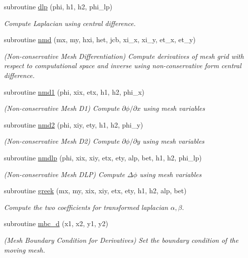 \begin{DoxyCompactItemize}
subroutine \hyperlink{classmirana_a353bce8a93046cd8fd25021634d6503e}{dlp} (phi, h1, h2, phi\-\_\-lp)
\begin{DoxyCompactList}\small\item\em Compute Laplacian using central difference. \end{DoxyCompactList}\item 
subroutine \hyperlink{classmirana_a53c223d4530275ef3fc6a5820f5b0990}{nmd} (mx, my, hxi, het, jcb, xi\-\_\-x, xi\-\_\-y, et\-\_\-x, et\-\_\-y)
\begin{DoxyCompactList}\small\item\em (Non-\/conservative Mesh Differentiation) Compute derivatives of mesh grid with respect to computational space and inverse using non-\/conservative form central difference. \end{DoxyCompactList}\item 
subroutine \hyperlink{classmirana_a6b48fffbaaa6f2256928cd73d8891261}{nmd1} (phi, xix, etx, h1, h2, phi\-\_\-x)
\begin{DoxyCompactList}\small\item\em (Non-\/conservative Mesh D1) Compute $\partial\phi/\partial x$ using mesh variables \end{DoxyCompactList}\item 
subroutine \hyperlink{classmirana_a04bd9101c8bdc2f8b69892bd773f3055}{nmd2} (phi, xiy, ety, h1, h2, phi\-\_\-y)
\begin{DoxyCompactList}\small\item\em (Non-\/conservative Mesh D2) Compute $\partial\phi/\partial y$ using mesh variables \end{DoxyCompactList}\item 
subroutine \hyperlink{classmirana_a503a76ad6fbdf28508f8d71786bed518}{nmdlp} (phi, xix, xiy, etx, ety, alp, bet, h1, h2, phi\-\_\-lp)
\begin{DoxyCompactList}\small\item\em (Non-\/conservative Mesh D\-L\-P) Compute $\Delta\phi$ using mesh variables \end{DoxyCompactList}\item 
subroutine \hyperlink{classmirana_a7530ea2e7b2dfe85f3a088d24de59f1d}{greek} (mx, my, xix, xiy, etx, ety, h1, h2, alp, bet)
\begin{DoxyCompactList}\small\item\em Compute the two coefficients for transformed laplacian $\alpha,\beta$. \end{DoxyCompactList}\item 
subroutine \hyperlink{classmirana_a65a514d206d0e8ae53253938d2aff553}{mbc\-\_\-d} (x1, x2, y1, y2)
\begin{DoxyCompactList}\small\item\em (Mesh Boundary Condition for Derivatives) Set the boundary condition of the moving mesh. \end{DoxyCompactList}\end{DoxyCompactItemize}


